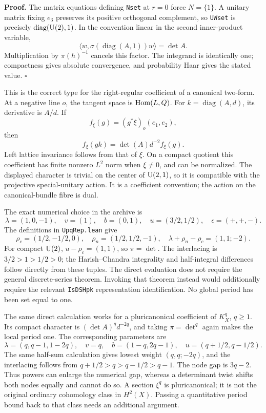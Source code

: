 \documentclass[11pt]{article}
\theoremstyle{definition}\newtheorem{definition}[theorem]{Definition}\newtheorem{remark}[theorem]{Remark}
\begin{document}
\textbf{Proof.} The matrix equations defining \texttt{Nset} at $r=0$ force $N=\{1\}$. A unitary matrix fixing $e_3$ preserves its positive orthogonal complement, so \texttt{UWset} is precisely $\operatorname{diag}(\operatorname{U}(2),1)$. In the convention linear in the second inner-product variable,
\[
 \langle w,\sigma(\operatorname{diag}(A,1))w\rangle=\det A.
\]
Multiplication by $\pi(h)^{-1}$ cancels this factor. The integrand is identically one; compactness gives absolute convergence, and probability Haar gives the stated value. \hfill$\square$

This is the correct type for the right-regular coefficient of a canonical two-form. At a negative line $o$, the tangent space is $\operatorname{Hom}(L,Q)$. For $k=\operatorname{diag}(A,d)$, its derivative is $A/d$. If
\[
 f_\xi(g)=(g^*\xi)_o(e_1,e_2),
\]
then
\[
 f_\xi(gk)=\det(A)d^{-2}f_\xi(g).
\]
Left lattice invariance follows from that of $\xi$. On a compact quotient this coefficient has finite nonzero $L^2$ norm when $\xi\ne0$, and can be normalized. The displayed character is trivial on the center of $\operatorname{U}(2,1)$, so it is compatible with the projective special-unitary action. It is a coefficient convention; the action on the canonical-bundle fibre is dual.

The exact numerical choice in the archive is
\[
 \lambda=(1,0,-1),\quad v=(1),\quad b=(0,1),\quad
 u=(3/2,1/2),\quad\epsilon=(+,+,-).
\]
The definitions in \texttt{UpqRep.lean} give
\[
 \rho_c=(1/2,-1/2,0),\quad\rho_n=(1/2,1/2,-1),\quad
 \lambda+\rho_n-\rho_c=(1,1;-2).
\]
For compact $\operatorname{U}(2)$, $u-\rho_c=(1,1)$, so $\pi=\det$. The interlacing is
$3/2>1>1/2>0$; the Harish--Chandra integrality and half-integral differences follow directly from these tuples. The direct evaluation does not require the general discrete-series theorem. Invoking that theorem instead would additionally require the relevant \texttt{IsDSHpk} representation identification. No global period has been set equal to one.

The same direct calculation works for a pluricanonical coefficient of $K_X^q$, $q\geq1$. Its compact character is $(\det A)^qd^{-2q}$, and taking $\pi=\det^q$ again makes the local period one. The corresponding parameters are
\[
 \lambda=(q,q-1,1-2q),\quad v=q,\quad
 b=(1-q,2q-1),\quad u=(q+1/2,q-1/2).
\]
The same half-sum calculation gives lowest weight $(q,q;-2q)$, and the interlacing follows from
$q+1/2>q>q-1/2>q-1$. The node gap is $3q-2$. Thus powers can enlarge the numerical gap, whereas a determinant twist shifts both nodes equally and cannot do so. A section $\xi^q$ is pluricanonical; it is not the original ordinary cohomology class in $H^2(X)$. Passing a quantitative period bound back to that class needs an additional argument.
\end{document}
